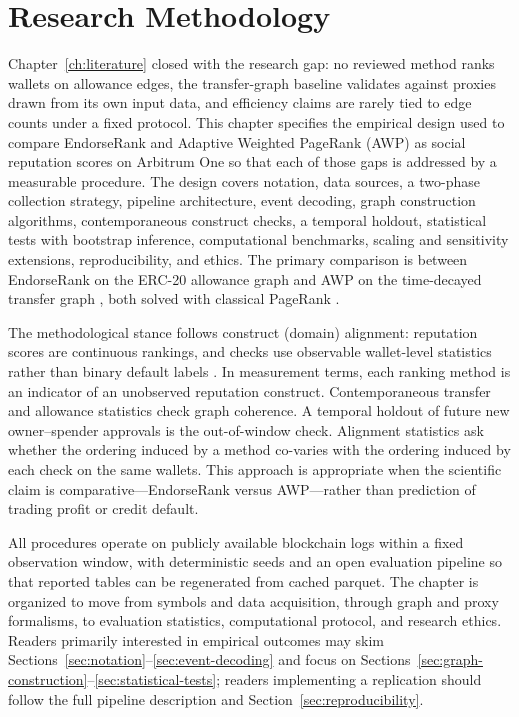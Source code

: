 \chapter{Research Methodology}
\label{ch:methodology}

Chapter~\ref{ch:literature} closed with the research gap: no reviewed method ranks wallets on allowance edges, the transfer-graph baseline validates against proxies drawn from its own input data, and efficiency claims are rarely tied to edge counts under a fixed protocol. This chapter specifies the empirical design used to compare EndorseRank and Adaptive Weighted PageRank (AWP) as social reputation scores on Arbitrum One so that each of those gaps is addressed by a measurable procedure. The design covers notation, data sources, a two-phase collection strategy, pipeline architecture, event decoding, graph construction algorithms, contemporaneous construct checks, a temporal holdout, statistical tests with bootstrap inference, computational benchmarks, scaling and sensitivity extensions, reproducibility, and ethics. The primary comparison is between EndorseRank on the ERC-20 allowance graph and AWP on the time-decayed transfer graph , both solved with classical PageRank .

The methodological stance follows construct (domain) alignment: reputation scores are continuous rankings, and checks use observable wallet-level statistics rather than binary default labels . In measurement terms, each ranking method is an indicator of an unobserved reputation construct. Contemporaneous transfer and allowance statistics check graph coherence. A temporal holdout of future new owner--spender approvals is the out-of-window check. Alignment statistics ask whether the ordering induced by a method co-varies with the ordering induced by each check on the same wallets. This approach is appropriate when the scientific claim is comparative---EndorseRank versus AWP---rather than prediction of trading profit or credit default.

All procedures operate on publicly available blockchain logs within a fixed observation window, with deterministic seeds and an open evaluation pipeline so that reported tables can be regenerated from cached parquet. The chapter is organized to move from symbols and data acquisition, through graph and proxy formalisms, to evaluation statistics, computational protocol, and research ethics. Readers primarily interested in empirical outcomes may skim Sections~\ref{sec:notation}--\ref{sec:event-decoding} and focus on Sections~\ref{sec:graph-construction}--\ref{sec:statistical-tests}; readers implementing a replication should follow the full pipeline description and Section~\ref{sec:reproducibility}.

